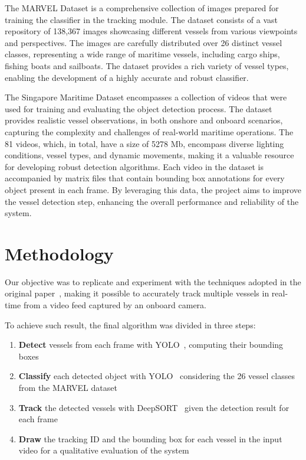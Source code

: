 \documentclass[a4paper,12pt]{article}
\begin{document}
\begin{multicols}{2}
The MARVEL Dataset is a comprehensive collection of images prepared for training the classifier in the tracking module.
The dataset consists of a vast repository of 138,367 images showcasing different vessels from various viewpoints and perspectives.
The images are carefully distributed over 26 distinct vessel classes, representing a wide range of maritime vessels, including cargo ships, fishing boats and sailboats.
The dataset provides a rich variety of vessel types, enabling the development of a highly accurate and robust classifier.

The Singapore Maritime Dataset encompasses a collection of videos that were used for training and evaluating the object detection process.
The dataset provides realistic vessel observations, in both onshore and onboard scenarios, capturing the complexity and challenges of real-world maritime operations.
The 81 videos, which, in total, have a size of 5278 Mb, encompass diverse lighting conditions, vessel types, and dynamic movements, making it a valuable resource for developing robust detection algorithms.
Each video in the dataset is accompanied by matrix files that contain bounding box annotations for every object present in each frame.
By leveraging this data, the project aims to improve the vessel detection step, enhancing the overall performance and reliability of the system.

\section{Methodology}\label{sec:methodology}
Our objective was to replicate and experiment with the techniques adopted in the original paper~\cite{MVDTHME}, making it possible to accurately track multiple vessels in real-time from a video feed captured by an onboard camera.

To achieve such result, the final algorithm was divided in three steps:
\begin{enumerate}
    \item \textbf{Detect} vessels from each frame with YOLO~\cite{YOLOV8}, computing their bounding boxes
    \item \textbf{Classify} each detected object with YOLO~\cite{YOLOV8} considering the 26 vessel classes from the MARVEL dataset
    \item \textbf{Track} the detected vessels with DeepSORT~\cite{DEEPSORT} given the detection result for each frame
    \item \textbf{Draw} the tracking ID and the bounding box for each vessel in the input video for a qualitative evaluation of the system
\end{enumerate}


\end{multicols}
\end{document}
